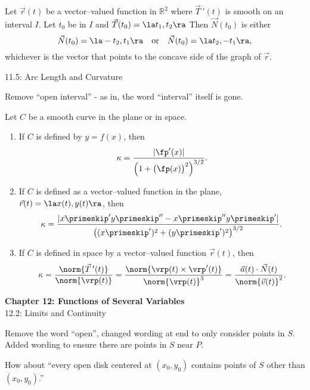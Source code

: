 \documentclass{article}
\begin{document}
{Let $\vec r(t)$ be a vector--valued function in $\mathbb{R}^2$ where $\vec T\,'(t)$ is smooth on an  interval $I$. Let $t_0$ be in $I$ and $\vec T(t_0) = \la t_1,t_2\ra$ Then $\vec N(t_0)$ is either
$$\vec N(t_0) = \la -t_2,t_1\ra \quad \text{or}\quad \vec N(t_0) = \la t_2,-t_1\ra,$$ whichever is the vector that points to the concave side of the graph of $\vec r$.
}

11.5: Arc Length and Curvature

Remove ``open interval'' - as in, the word ``interval'' itself is gone.
{%
Let $C$ be a smooth curve in the plane or in space.%
\begin{enumerate}
	\item If $C$ is defined by $y=f(x)$, then 
	$$\kappa = \frac{|\fp'(x)|}{\Big(1+\big(\fp(x)\big)^2\Big)^{3/2}}.$$
	\item	If $C$ is defined as a vector--valued function in the plane, $\vec r(t) = \la x(t), y(t)\ra$, then
	$$\kappa = \frac{|x\primeskip'y\primeskip''-x\primeskip''y\primeskip'|}{\big((x\primeskip')^2+(y\primeskip')^2\big)^{3/2}}.$$
	\item If $C$ is defined in space by a vector--valued function $\vec r(t)$, then
$$\kappa = \frac{\norm{\vec T\,'(t)}}{\norm{\vrp(t)}} = \frac{\norm{\vrp(t)\times\vrp'(t)}}{\norm{\vrp(t)}^3} = \frac{\vec a(t)\cdot \vec N(t)}{\norm{\vec v(t)}^2}.$$
\end{enumerate}
}






\noindent\large\textbf{Chapter 12: Functions of Several Variables}\normalsize\\

12.2: Limits and Continuity

Remove the word ``open'', changed wording at end to only consider points in $S$.  Added wording to ensure there are points in $S$ near $P$.

How about ``every open disk centered at $(x_0,y_0)$ contains points of $S$ other than $(x_0,y_0)$.''
\end{document}
